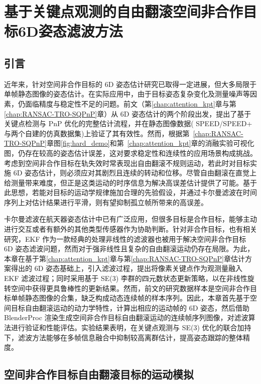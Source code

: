 
\chapter{基于关键点观测的自由翻滚空间非合作目标6D姿态滤波方法}
\label{chap:SpaceFreeMotionEKF}
\section{引言}
近年来，针对空间非合作目标的 6D 姿态估计研究已取得一定进展，但大多局限于单帧静态图像的姿态估计。在实际应用中，由于目标姿态复杂变化及测量噪声等因素，仍面临精度与稳定性不足的问题。前文（第\ref{chap:attention_kpt}章与第\ref{chap:RANSAC-TRO-SQPnP}章）从 6D 姿态估计的两个阶段出发，提出了基于关键点检测与 PnP 优化的完整估计流程，并在静态图像数据( SPEED/SPEED+ 与两个自建的仿真数据集)上验证了其有效性。然而，根据第~\ref{chap:RANSAC-TRO-SQPnP}章图\ref{fig:hard_demo}和第~\ref{chap:attention_kpt}章的消融实验可视化图，仍存在较高的姿态估计误差，这对要求稳定性和连续性的应用场景构成挑战。考虑到空间非合作目标在轨失效时常表现出自由翻滚不规则运动，若此时对目标实施 6D 姿态估计，则必须应对其剧烈且连续的转动和位移。尽管自由翻滚在直觉上给测量带来难度，但正是这类运动的时序信息为解决高误差估计提供了可能。基于此思想，若能对目标的运动学规律施加合理的先验假设，并通过卡尔曼滤波在时间序列上对估计结果进行平滑，则有望抑制孤立帧所带来的高误差。

卡尔曼滤波在航天器姿态估计中已有广泛应用，但很多目标是合作目标，能够主动进行交互或者有额外的其他类型传感器作为协助判断\cite{DQWX202212007,CHWZ202205009,hudoba2024distributed}。针对非合作目标，也有相关研究\cite{s24061811,zhang2023pose,XDFJ20250225001}，EKF 作为一款经典的处理非线性的滤波器也被用于解决空间非合作目标 6D 姿态滤波问题，然而对于强非线性且复杂的自由翻滚运动仍存在局限。为此，本章在基于第\ref{chap:attention_kpt}章与第\ref{chap:RANSAC-TRO-SQPnP}章估计方案得出的 6D 姿态基础上，引入滤波过程，提出将像素关键点作为观测量融入 EKF 滤波过程；同时采用基于 SE(3) 李群的四元数状态更新策略，以在非线性旋转空间中获得更具鲁棒性的更新结果。然而，前文的研究数据样本是空间非合作目标单帧静态图像的合集，缺乏构成动态连续帧的样本序列。因此，本章首先基于空间目标自由翻滚运动的动力学特性，计算出相应的运动帧的 6D 姿态，然后借助 BlenderProc 渲染生成空间非合作目标自由翻滚运动的连续帧序列图像，对滤波算法进行验证和性能评估。实验结果表明，在关键点观测与 SE(3) 优化的联合加持下，滤波方法能够在多帧信息融合中抑制较高离群估计，提高姿态跟踪的整体精度。


\section{空间非合作目标自由翻滚目标的运动模拟}

